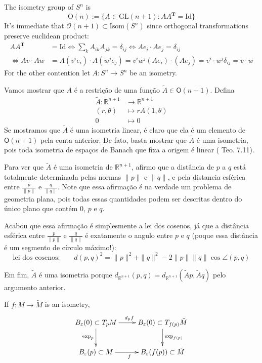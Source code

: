 \begin{example}
\label{example-isometry-group-of-Sn}
The isometry group of $S^n$ is
$$
\text{O}(n):=\{A\in\text{GL}(n+1):AA^{\mathbf{T}}=\text{Id}\}
$$
It's immediate that $\mathcal{O}(n+1)\subset \text{Isom}(S^n)$ since orthogonal
transformations preserve euclidean product:
\begin{align*}
A A^{\mathbf{T}}&=\text{Id}\iff \sum_k A_{ik}A_{jk}=\delta_{ij}
\iff Ae_i\cdot Ae_j=\delta_{ij}\\ 
\iff Av\cdot Aw&= A\left( v^ie_i\right) \cdot A\left( w^je_j\right) 
=v^iw^j (Ae_i)\cdot (Ae_j)
=v^i\cdot w^j\delta_{ij}=v\cdot w
\end{align*}
For the other contention let $A:S^n \to S^n$ be an isometry.

Vamos mostrar que $A$ é a restrição de uma função $\tilde{A} \in
\mathsf{O}(n+1)$. Defina
\begin{align*}
\tilde{A}: \mathbb{R}^{n+1} &\longrightarrow \mathbb{R}^{n+1} \\
(r,\theta) &\longmapsto rA(1,\theta)\\
0&\longmapsto 0
\end{align*}
Se mostramos que $\tilde{A}$ é uma isometria linear, é claro que ela é um
elemento de $\mathsf{O}(n+1)$ pela conta anterior. De fato, basta mostrar que
$\tilde{A}$ é uma isometria, pois toda isometria de espaços de Banach que fixa
a origem é linear (\cite{braga} Teo. 7.11).

Para ver que $\tilde{A}$ é uma isometria de $\mathbb{R}^{n+1}$,
afirmo que a distância de $p$ a $q$ está totalmente determinada
pelas normas  $\|p\|$ e $\|q\|$, e pela distancia esférica entre
$\frac{p}{\|p\|}$ e $\frac{q}{\|q\|}$. Note que essa afirmação é na verdade
um problema de geometria plana, pois todas essas quantidades podem ser descritas
dentro do único plano que contém $0$, $p$ e $q$.

Acabou que essa afirmação é simplesmente a lei dos cosenos, já que a distância
esférica entre $\frac{p}{\|p\|}$ e $\frac{q}{\|q\|}$ é exatamente o angulo
entre $p$ e $q$ (poque essa distância é um segmento de círculo máximo!):
\[\text{lei dos cosenos:} \qquad d(p,q)^2=\|p\|^2+\|q\|^2-2\|p\|\|q\| \cos
\angle(p,q) \]

Em fim, $\tilde{A}$ é uma isometria porque
$d_{\mathbb{R}^{n+1}}(p,q)=d_{\mathbb{R}^{n+1}}(\tilde{A}p,\tilde{A}q)$ pelo
argumento anterior.
\end{example}

\begin{proposition}
\label{proposition-naturallity-of-exponential}
If $f:M\to \tilde{M}$ is an isometry,
$$
\xymatrix{
B_\varepsilon(0)\subset T_pM \ar[r]^{d_p f} \ar[d]_{\text{exp}_p} &
B_\varepsilon(0)\subset T_{f(p)}\tilde{M} \ar[d]^{\text{exp}_{f(p)}} \\
B_\varepsilon(p)\subset M \ar[r]_{f} & B_\varepsilon(f(p))\subset \tilde{M}
}
$$
\end{proposition}

